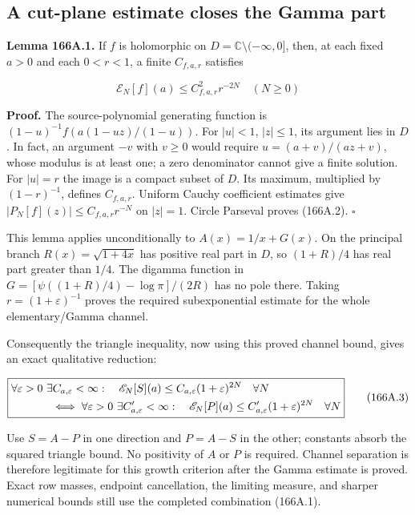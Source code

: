 \documentclass[
  11pt,
]{book}
\begin{document}
\subsection{A cut-plane estimate closes the Gamma
part}\label{a-cut-plane-estimate-closes-the-gamma-part}

\textbf{Lemma 166A.1.} If \(f\) is holomorphic on
\(D=\mathbb C\setminus(-\infty,0]\), then, at each fixed \(a>0\) and
each \(0<r<1\), a finite \(C_{f,a,r}\) satisfies

\[
\mathscr E_N[f](a)\le C_{f,a,r}^2 r^{-2N}\quad(N\ge0)
\tag{166A.2}
\]

\textbf{Proof.} The source-polynomial generating function is
\((1-u)^{-1}f(a(1-uz)/(1-u))\). For \(|u|<1\), \(|z|\le1\), its argument
lies in \(D\). In fact, an argument \(-v\) with \(v\ge0\) would require
\(u=(a+v)/(az+v)\), whose modulus is at least one; a zero denominator
cannot give a finite solution. For \(|u|=r\) the image is a compact
subset of \(D\). Its maximum, multiplied by \((1-r)^{-1}\), defines
\(C_{f,a,r}\). Uniform Cauchy coefficient estimates give
\(|P_N[f](z)|\le C_{f,a,r}r^{-N}\) on \(|z|=1\). Circle Parseval proves
(166A.2). \(\square\)

This lemma applies unconditionally to \(A(x)=1/x+G(x)\). On the
principal branch \(R(x)=\sqrt{1+4x}\) has positive real part in \(D\),
so \((1+R)/4\) has real part greater than \(1/4\). The digamma function
in \(G=[\psi((1+R)/4)-\log\pi]/(2R)\) has no pole there. Taking
\(r=(1+\varepsilon)^{-1}\) proves the required subexponential estimate
for the whole elementary/Gamma channel.

Consequently the triangle inequality, now using this proved channel
bound, gives an exact qualitative reduction:

\[
\boxed{\begin{aligned}
&\forall\varepsilon>0\ \exists C_{a,\varepsilon}<\infty:
\quad\mathscr E_N[S](a)\le C_{a,\varepsilon}(1+\varepsilon)^{2N}
\quad\forall N\\
&\hspace{12mm}\iff
\forall\varepsilon>0\ \exists C'_{a,\varepsilon}<\infty:
\quad\mathscr E_N[P](a)\le C'_{a,\varepsilon}(1+\varepsilon)^{2N}
\quad\forall N
\end{aligned}}
\tag{166A.3}
\]

Use \(S=A-P\) in one direction and \(P=A-S\) in the other; constants
absorb the squared triangle bound. No positivity of \(A\) or \(P\) is
required. Channel separation is therefore legitimate for this growth
criterion after the Gamma estimate is proved. Exact row masses, endpoint
cancellation, the limiting measure, and sharper numerical bounds still
use the completed combination (166A.1).
\end{document}

